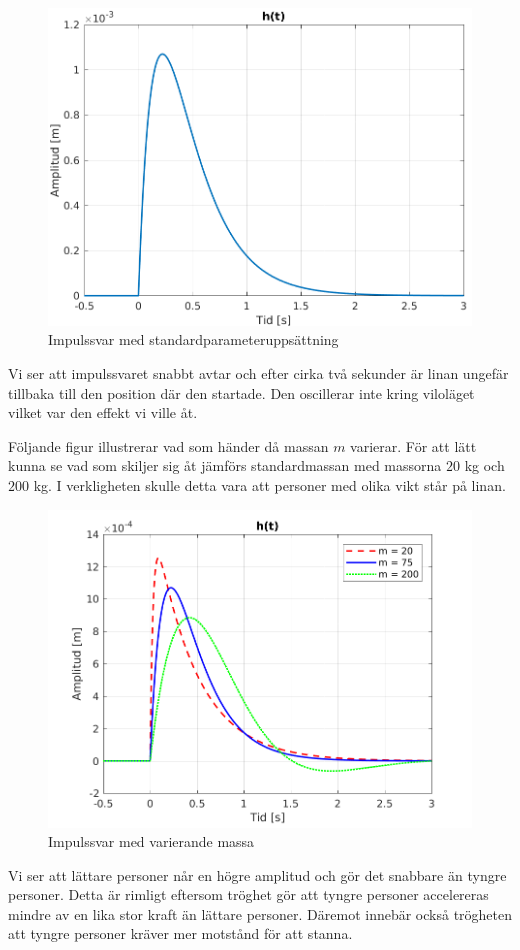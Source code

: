 \begin{figure}[H]
    \centering
    \includegraphics[scale=0.9]{bilder/impulssvar}
    \caption{Impulssvar med standardparameteruppsättning}
    \label{fig:impulssvar}
\end{figure}
Vi ser att impulssvaret snabbt avtar och efter cirka två sekunder är linan ungefär tillbaka till den position där den startade. Den oscillerar inte kring viloläget vilket var den effekt vi ville åt.

\newpage
Följande figur illustrerar vad som händer då massan $m$ varierar. För att lätt kunna se vad som skiljer sig åt jämförs standardmassan med massorna $20$ kg och $200$ kg. I verkligheten skulle detta vara att personer med olika vikt står på linan.
\begin{figure}[H]
    \centering
    \includegraphics[scale=0.9]{bilder/impulssvar_variation_m}
    \caption{Impulssvar med varierande massa}
    \label{fig:impulssvar_variation_m}
\end{figure}
Vi ser att lättare personer når en högre amplitud och gör det snabbare än tyngre personer. Detta är rimligt eftersom tröghet gör att tyngre personer accelereras mindre av en lika stor kraft än lättare personer. Däremot innebär också trögheten att tyngre personer kräver mer motstånd för att stanna. 

